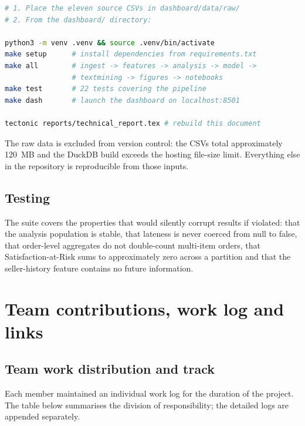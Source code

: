 \documentclass[11pt,a4paper]{article}
\begin{document}
\begin{lstlisting}[language=bash,caption={Full reproduction from raw data.}]
# 1. Place the eleven source CSVs in dashboard/data/raw/
# 2. From the dashboard/ directory:

python3 -m venv .venv && source .venv/bin/activate
make setup      # install dependencies from requirements.txt
make all        # ingest -> features -> analysis -> model ->
                # textmining -> figures -> notebooks
make test       # 22 tests covering the pipeline
make dash       # launch the dashboard on localhost:8501

tectonic reports/technical_report.tex # rebuild this document
\end{lstlisting}

The raw data is excluded from version control: the CSVs total approximately 120~MB
and the DuckDB build exceeds the hosting file-size limit. Everything else in the
repository is reproducible from those inputs.

\subsection{Testing}

The suite covers the properties that would silently corrupt results if violated:
that the analysis population is stable, that lateness is never coerced from null to
false, that order-level aggregates do not double-count multi-item orders, that
Satisfaction-at-Risk sums to approximately zero across a partition and that the
seller-history feature contains no future information.

\section{Team contributions, work log and links}
\subsection{Team work distribution and track}
Each member maintained an individual work log for the duration of the project. The
table below summarises the division of responsibility; the detailed logs are
appended separately.
\end{document}
